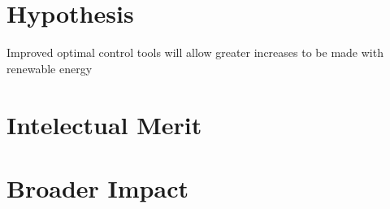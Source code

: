 \documentclass{article}
\begin{document}


\section{Hypothesis}

Improved optimal control tools will allow greater increases to be made with
renewable energy



\section{Intelectual Merit}


\section{Broader Impact}
\end{document}
